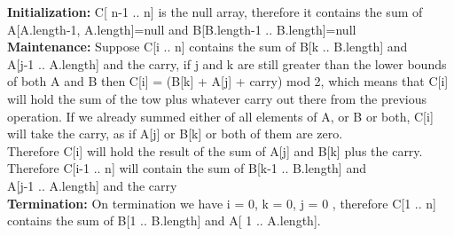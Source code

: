 \documentclass{article}
\begin{document}
\noindent \textbf{Initialization:} C[ n-1 .. n] is the null array,
therefore it contains the sum of A[A.length-1, A.length]=null
and B[B.length-1 .. B.length]=null\\
\noindent \textbf{Maintenance:} Suppose C[i .. n] contains the sum
of B[k .. B.length] and \\A[j-1 .. A.length] and the carry, 
if j and k are still greater than the lower bounds of both A and B
then C[i] = (B[k] + A[j] + carry) mod 2, which means that C[i]
will hold the sum of the tow plus whatever carry out there from
the previous operation. If we already summed either of all 
elements of A, or B or both, C[i] will take the carry, as 
if A[j] or B[k] or both of them are zero.\\
Therefore C[i] will hold the result of the sum of A[j] and B[k]
plus the carry. \\Therefore C[i-1 .. n] will contain the sum of
B[k-1 .. B.length] and \\A[j-1 .. A.length] and the  carry\\
\noindent \textbf{Termination:} On termination we
have i = 0, k = 0, j = 0 , therefore C[1 .. n] contains the sum of
B[1 .. B.length] and A[ 1 .. A.length].\\
\end{document}
